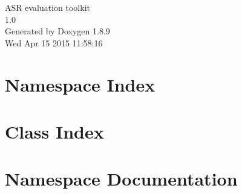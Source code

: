 \documentclass[twoside]{book}
\newcommand{\+}{\discretionary{\mbox{\scriptsize$\hookleftarrow$}}{}{}}
\newcommand{\clearemptydoublepage}{%
  \newpage{\pagestyle{empty}\cleardoublepage}%
}
\begin{document}
\begin{titlepage}
\vspace*{7cm}
\begin{center}%
{\Large A\+S\+R evaluation toolkit \\[1ex]\large 1.\+0 }\\
\vspace*{1cm}
{\large Generated by Doxygen 1.8.9}\\
\vspace*{0.5cm}
{\small Wed Apr 15 2015 11:58:16}\\
\end{center}
\end{titlepage}
\clearemptydoublepage
\tableofcontents
\clearemptydoublepage
{}

\chapter{Namespace Index}

\chapter{Class Index}

\chapter{Namespace Documentation}






\end{document}
